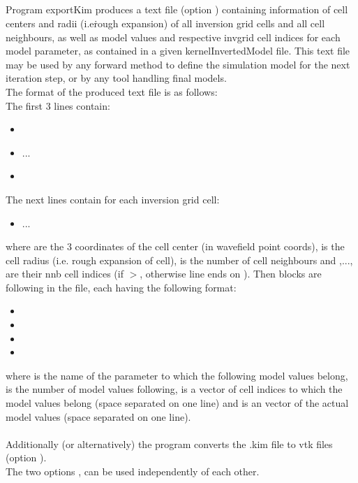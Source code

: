\subsection{} \label{programs_scripts,sec:bin_prog,sec:exp_Kim}
Program exportKim produces a text file (option ) containing information of cell centers and radii 
(i.e\. rough expansion) of all inversion grid cells and all cell neighbours, as well as model values and 
respective invgrid cell indices for each model parameter, as contained in a given kernelInvertedModel file. 
This text file may be used by any forward method to define the simulation model for the next iteration step, 
or by any tool handling final models.\\
The format of the produced text file is as follows:\\
The first 3 lines contain:
\begin{itemize}
\item[]
\item[]   ... 
\item[]
\end{itemize}
The next  lines contain for each inversion grid cell:
\begin{itemize}
\item[] ... 
\end{itemize} 
where  are the 3 coordinates of the cell center (in wavefield point coords),  
is the cell radius (i.e. rough expansion of cell),  is the number of cell neighbours and 
,..., are their nnb cell indices (if \(>\), otherwise line 
ends on ). Then  blocks are following in the file, each having 
the following format:
\begin{itemize}
\item[]
\item[]
\item[]
\item[]
\end{itemize}
where  is the name of the parameter to which the following model values belong, 
 is the number of model values following,  is a vector of  
cell indices to which the model values belong (space separated on one line) and  
is an vector of the actual  model values (space separated on one line).\\
\\
Additionally (or alternatively) the program converts the .kim file to vtk files (option ).\\
The two options  ,  can be used independently of each other.
